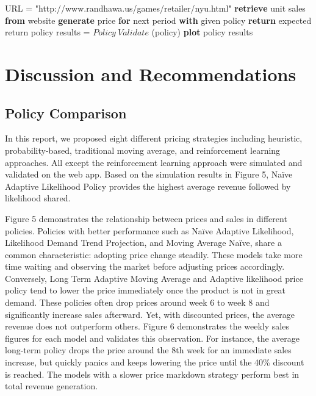 \documentclass[11pt,a4paper]{article}
\begin{document}
\begin{algorithmic}[1]
    \State URL = "http://www.randhawa.us/games/retailer/nyu.html"
        \State \textbf{retrieve} unit sales \textbf{from} website
        \State \textbf{generate} price \textbf{for} next period \textbf{with} given policy
    \EndFor
    \State \textbf{return} expected return
    \EndProcedure
    \State
            \State policy results = $Policy\ Validate$ (policy) 
        \EndFor
    \EndFor
    \State \textbf{plot} policy results
\end{algorithmic}

\section{Discussion and Recommendations}

\subsection{Policy Comparison}
In this report, we proposed eight different pricing strategies including heuristic, probability-based, traditional moving average, and reinforcement learning approaches. 
All except the reinforcement learning approach were simulated and validated on the web app. 
Based on the simulation results in Figure 5, Naïve Adaptive Likelihood Policy provides the highest average revenue followed by likelihood shared.

Figure 5 demonstrates the relationship between prices and sales in different policies. 
Policies with better performance such as Naïve Adaptive Likelihood, Likelihood Demand Trend Projection, and Moving Average Naïve, share a common characteristic: adopting price change steadily. 
These models take more time waiting and observing the market before adjusting prices accordingly. 
Conversely, Long Term Adaptive Moving Average and Adaptive likelihood price policy tend to lower the price immediately once the product is not in great demand. 
These policies often drop prices around week 6 to week 8 and significantly increase sales afterward. 
Yet, with discounted prices, the average revenue does not outperform others. 
Figure 6 demonstrates the weekly sales figures for each model and validates this observation. 
For instance, the average long-term policy drops the price around the 8th week for an immediate sales increase, but quickly panics and keeps lowering the price until the 40\% discount is reached. 
The models with a slower price markdown strategy perform best in total revenue generation.
\end{document}
